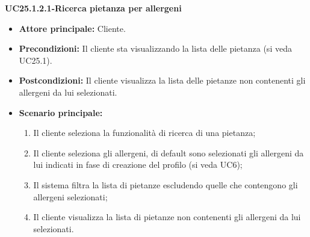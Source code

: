 \textbf{UC25.1.2.1-Ricerca pietanza per allergeni}
\begin{itemize}
\item \textbf{Attore principale:} Cliente.
\item \textbf{Precondizioni:}  Il cliente sta visualizzando la lista delle pietanza (si veda UC25.1).
\item \textbf{Postcondizioni:} Il cliente visualizza la lista delle pietanze non contenenti gli allergeni da lui selezionati.
\item \textbf{Scenario principale:}
\begin{enumerate}
    \item Il cliente seleziona la funzionalità di ricerca di una pietanza;
    \item Il cliente seleziona gli allergeni, di default sono selezionati gli allergeni da lui indicati in fase di creazione del profilo (si veda UC6);
    \item Il sistema filtra la lista di pietanze escludendo quelle che contengono gli allergeni selezionati;
    \item Il cliente visualizza la lista di pietanze non contenenti gli allergeni da lui selezionati.
\end{enumerate}
\end{itemize}

